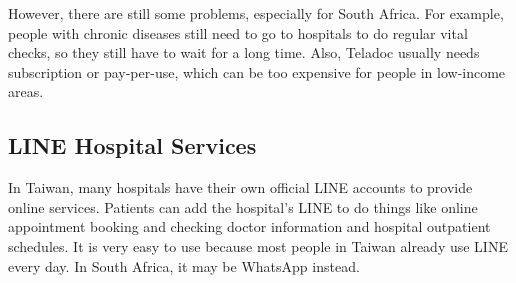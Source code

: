 However, there are still some problems, especially for South Africa. For example, people with chronic diseases still need to go to hospitals to do regular vital checks, so they still have to wait for a long time. Also, Teladoc usually needs subscription or pay-per-use, which can be too expensive for people in low-income areas.

\subsection{LINE Hospital Services}

In Taiwan, many hospitals have their own official LINE accounts to provide online services. Patients can add the hospital’s LINE to do things like online appointment booking and checking doctor information and hospital outpatient schedules. It is very easy to use because most people in Taiwan already use LINE every day. In South Africa, it may be WhatsApp instead.

